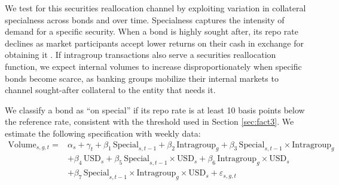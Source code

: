 \documentclass[english, 12pt, oneside]{article}
\begin{document}
We test for this securities reallocation channel by exploiting variation in collateral specialness across bonds and over time. Specialness captures the intensity of demand for a specific security. When a bond is highly sought after, its repo rate declines as market participants accept lower returns on their cash in exchange for obtaining it \citep{duffie1996}. If intragroup transactions also serve a securities reallocation function, we expect internal volumes to increase disproportionately when specific bonds become scarce, as banking groups mobilize their internal markets to channel sought-after collateral to the entity that needs it.

We classify a bond as ``on special'' if its repo rate is at least 10 basis points below the reference rate, consistent with the threshold used in Section \ref{sec:fact3}. We estimate the following specification with weekly data:
\begin{equation}
\begin{aligned}
\text{Volume}_{s,g,t} = {} & \alpha_s + \gamma_t
+ \beta_1 \, \text{Special}_{s,t-1}
+ \beta_2 \, \text{Intragroup}_{g}
+ \beta_3 \, \text{Special}_{s,t-1} \times \text{Intragroup}_{g} \\
& + \beta_4 \, \text{USD}_{s}
+ \beta_5 \, \text{Special}_{s,t-1} \times \text{USD}_{s}
+ \beta_6 \, \text{Intragroup}_{g} \times \text{USD}_{s} \\
& + \beta_7 \, \text{Special}_{s,t-1} \times \text{Intragroup}_{g} \times \text{USD}_{s}
+ \varepsilon_{s,g,t}
\end{aligned}
\end{equation}
\end{document}
